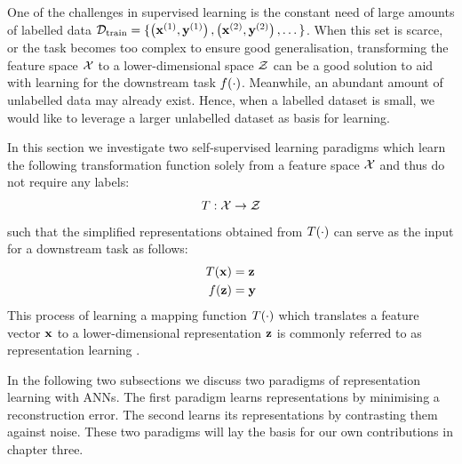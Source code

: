 
One of the challenges in supervised learning is the constant need of large amounts of labelled data $\mathcal{D}_{\text{train}} = \{ \left( \mathbf{x}^{(1)}, \mathbf{y}^{(1)} \right), \left( \mathbf{x}^{(2)}, \mathbf{y}^{(2)} \right), \dots \}$. When this set is scarce, or the task becomes too complex to ensure good generalisation, transforming the feature space $\mathcal{X}$ to a lower-dimensional space $\mathcal{Z}$ can be a good solution to aid with learning for the downstream task $f(\cdot)$. Meanwhile, an abundant amount of unlabelled data may already exist. Hence, when a labelled dataset is small, we would like to leverage a larger unlabelled dataset as basis for learning.

In this section we investigate two self-supervised learning paradigms which learn the following transformation function solely from a feature space $\mathcal{X}$ and thus do not require any labels:
$$T: \mathcal{X} \rightarrow \mathcal{Z}$$
such that the simplified representations obtained from $T(\cdot)$ can serve as the input for a downstream task as follows:
\begin{align*}
	T(\mathbf{x}) &=  \mathbf{z} \\
	f(\mathbf{z}) &= \mathbf{y} 
\end{align*}
This process of learning a mapping function $T(\cdot)$ which translates a feature vector $\mathbf{x}$ to a lower-dimensional representation $\mathbf{z}$ is commonly referred to as representation learning \cite{le-khacContrastiveRepresentationLearning2020}. 

In the following two subsections we discuss two paradigms of representation learning with ANNs. The first paradigm learns representations by minimising a reconstruction error. The second learns its representations by contrasting them against noise. These two paradigms will lay the basis for our own contributions in chapter three.

